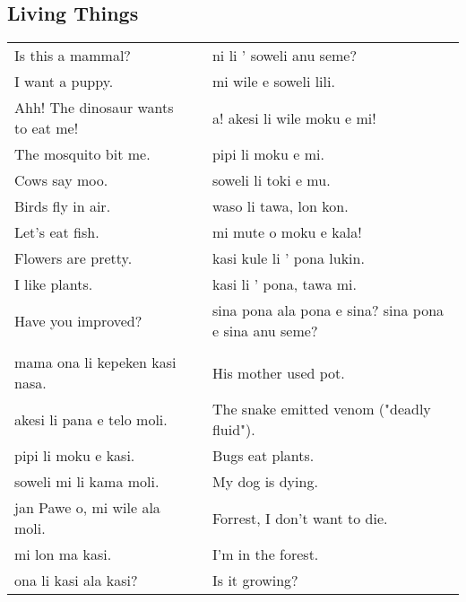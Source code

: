 \subsection*{Living Things} 
\label{'living_things'}
%



\begin{supertabular}{p{5,5cm}|ll}
Is this a mammal? && ni li ' soweli anu seme?  \\ %
I want a puppy.  && mi wile e soweli lili. \\ %
Ahh! The dinosaur wants to eat me!  && a! akesi li wile moku e mi! \\ %
The mosquito bit me.  && pipi li moku e mi.  \\ %
Cows say moo.  && soweli li toki e mu. \\ %
Birds fly in air.  && waso li tawa, lon kon. \\ %
Let's eat fish.  && mi mute o moku e kala! \\ %
Flowers are pretty.  && kasi kule li ' pona lukin. \\ %
I like plants.  && kasi li ' pona, tawa mi. \\ %
Have you improved? && sina pona ala pona e sina? sina pona e sina anu seme? \\ %
 && \\ %
mama ona li kepeken kasi nasa.  && His mother used pot. \\
akesi li pana e telo moli.  && The snake emitted venom ("deadly fluid"). \\
pipi li moku e kasi.  && Bugs eat plants. \\
soweli mi li kama moli.  && My dog is dying. \\
jan Pawe o, mi wile ala moli.  && Forrest, I don't want to die. \\
mi lon ma kasi.  && I'm in the forest. \\
ona li kasi ala kasi? && Is it growing?  \\
\end{supertabular} 

